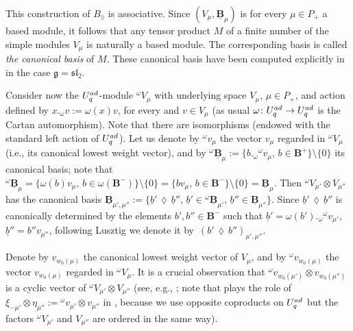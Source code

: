 \documentclass[11pt]{article}
\numberwithin{equation}{section}
\numberwithin{equation}{section}
\theoremstyle{definition}
\newcommand{\ra}{\rightarrow}
\begin{document}
This construction of $B_{\lozenge}$ is associative. Since $(V_\mu, \underline{\mathbf{B}}_{\mu})$ is for every $\mu\in P_+$ a based module, it follows that any tensor product $M$ of a finite number of the simple modules $V_\mu$ is naturally a based module. The corresponding basis is called {\it the canonical basis} of $M$. These canonical basis have been computed explicitly in \cite{FK} in the case $\mathfrak{g}={\mathfrak{sl}_2}$.

Consider now the $U_q^{\rm ad}$-module ${}^{\omega}V_{\mu}$ with underlying space $V_{\mu}$, $\mu\in P_+$, and action defined by $x._{\omega} v := \omega(x)v$, for every  and $v\in V_{\mu}$ (as usual $\omega\colon U_q^{\rm ad} \ra U_q^{\rm ad}$ is the Cartan automorphism). Note that there are isomorphisms  (endowed with the standard left action of $U_q^{\rm ad}$). Let us denote by ${}^\omega v_\mu$ the vector $v_\mu$ regarded in ${}^{\omega}V_{\mu}$ (i.e., its canonical lowest weight vector), and by ${}^\omega\underline{\mathbf{B}}_{\mu}:=\{b._{\omega}{}^\omega v_{\mu},\, b\in \mathbf{B}^+\}\setminus \{0\}$ its canonical basis; note that ${}^\omega\underline{\mathbf{B}}_{\mu} = \{\omega(b){}v_{\mu},\, b\in \omega(\mathbf{B}^-)\}\setminus \{0\} = \{b v_{\mu},\, b\in \mathbf{B}^-\}\setminus \{0\} = \underline{\mathbf{B}}_{\mu}$. Then ${}^{\omega}V_{\mu'}\otimes V_{\mu''}$ has the canonical basis $\underline{\mathbf{B}}_{\mu',\mu''} := \{\underline{b}'\,\lozenge\, \underline{b}'', \, \underline{b}'\in {}^\omega\underline{\mathbf{B}}_{\mu'},\, \underline{b}''\in \underline{\mathbf{B}}_{\mu''}\}$. Since $\underline{b}'\,\lozenge\, \underline{b}''$ is canonically determined by the elements $b' ,b''\in \mathbf{B}^-$ such that $\underline{b}' = \omega(b')._{\omega} {}^\omega v_{\mu'}$, $\underline{b}'' = b''v_{\mu''}$, following Lusztig we denote it by~${(b' \,\lozenge\, b'')_{\mu',\mu''}}$.

 Denote by $v_{w_0(\mu)}$ the canonical lowest weight vector of $V_{\mu}$, and by ${}^\omega v_{w_0(\mu)}$ the vector $v_{w_0(\mu)}$ regarded in ${}^{\omega}V_{\mu}$. It is a crucial observation that ${}^\omega v_{w_0(\mu')}\otimes v_{w_0(\mu'')}$ is a cyclic vector of ${}^{\omega}V_{\mu'}\otimes V_{\mu''}$ (see, e.g., \cite[Proposition~23.3.6]{Lusztig}; note that  plays the role of $\xi_{-\mu'}\otimes \eta_{\mu''}:= {}^\omega v_{\mu'}\otimes v_{\mu''}$ in \cite{Lusztig}, because we use opposite coproducts on $U_q^{\rm ad}$ but the factors ${}^{\omega}V_{\mu'}$ and $V_{\mu''}$ are ordered in the same way).
\end{document}
